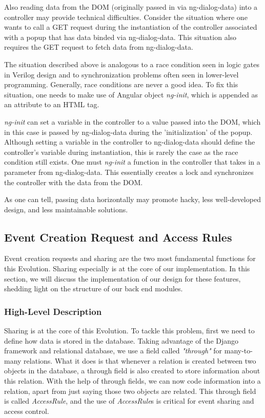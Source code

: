 \documentclass[a4paper]{article}
\begin{document}
Also reading data from the DOM (originally passed in via ng-dialog-data) into a controller may provide technical difficulties. Consider the situation where one wants to call a GET request during the instantiation of the controller associated with a popup that has data binded via ng-dialog-data. This situation also requires the GET request to fetch data from ng-dialog-data.

The situation described above is analogous to a race condition seen in logic gates in Verilog design and to synchronization problems often seen in lower-level programming. Generally, race conditions are never a good idea. To fix this situation, one needs to make use of Angular object \textit{ng-init}, which is appended as an attribute to an HTML tag. 

\textit{ng-init} can set a variable in the controller to a value passed into the DOM, which in this case is passed by ng-dialog-data during the 'initialization' of the popup. Although setting a variable in the controller to ng-dialog-data should define the controller's variable during instantiation, this is rarely the case as the race condition still exists. One must \textit{ng-init} a function in the controller that takes in a parameter from ng-dialog-data. This essentially creates a lock and synchronizes the controller with the data from the DOM.

As one can tell, passing data horizontally may promote hacky, less well-developed design, and less maintainable solutions.

\subsection{Event Creation Request and Access Rules}
Event creation requests and sharing are the two most fundamental functions for this Evolution. Sharing especially is at the core of our implementation. In this section, we will discuss the implementation of our design for these features, shedding light on the structure of our back end modules.

\subsubsection{High-Level Description}
Sharing is at the core of this Evolution. To tackle this problem, first we need to define how data is stored in the database. Taking advantage of the Django framework and relational database, we use a field called \emph{"through"} for many-to-many relations. What it does is that whenever a relation is created between two objects in the database, a through field is also created to store information about this relation. With the help of through fields, we can now code information into a relation, apart from just saying those two objects are related. This through field is called \emph{AccessRule}, and the use of \emph{AccessRule}s is critical for event sharing and access control.
\end{document}
